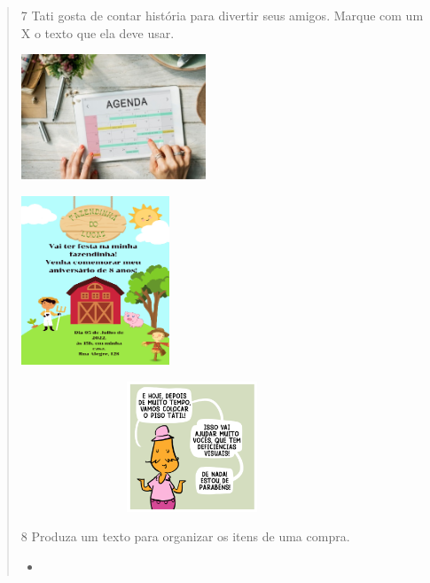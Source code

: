 \begin{verse}
\begin{escolha}
\end{escolha}

\num{7} Tati gosta de contar história para divertir seus amigos.
Marque com um X o texto que ela deve usar.

\includegraphics[width=2.16667in,height=1.47014in]{media/image108.jpeg}

\includegraphics[width=1.73819in,height=1.98472in]{media/image109.png}

\includegraphics[width=4.02222in,height=1.52917in]{media/image110.png}


\num{8} Produza um texto para organizar os itens de uma compra.


\begin{itemize}
\item \reduline{\mbox{}\hfill}


\end{itemize}
\end{verse}
